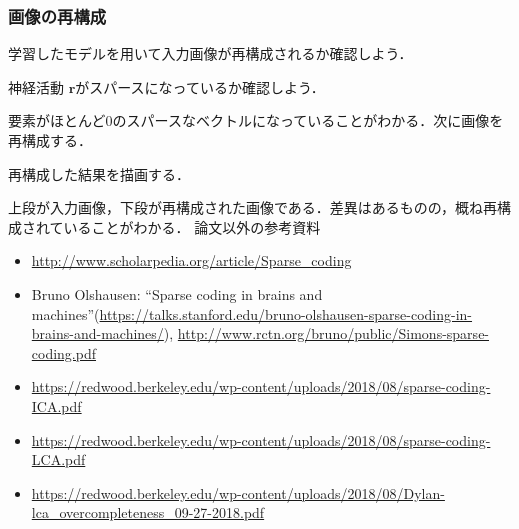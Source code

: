 \subsubsection{画像の再構成}
学習したモデルを用いて入力画像が再構成されるか確認しよう．

神経活動 $\mathbf{r}$がスパースになっているか確認しよう．


要素がほとんど0のスパースなベクトルになっていることがわかる．次に画像を再構成する．

再構成した結果を描画する．


上段が入力画像，下段が再構成された画像である．差異はあるものの，概ね再構成されていることがわかる．
論文以外の参考資料
\begin{itemize}
\item \url{http://www.scholarpedia.org/article/Sparse_coding}
\item Bruno Olshausen: “Sparse coding in brains and machines”(\url{https://talks.stanford.edu/bruno-olshausen-sparse-coding-in-brains-and-machines/}), \url{http://www.rctn.org/bruno/public/Simons-sparse-coding.pdf}
\item \url{https://redwood.berkeley.edu/wp-content/uploads/2018/08/sparse-coding-ICA.pdf}
\item \url{https://redwood.berkeley.edu/wp-content/uploads/2018/08/sparse-coding-LCA.pdf}
\item \url{https://redwood.berkeley.edu/wp-content/uploads/2018/08/Dylan-lca_overcompleteness_09-27-2018.pdf}
\end{itemize}
